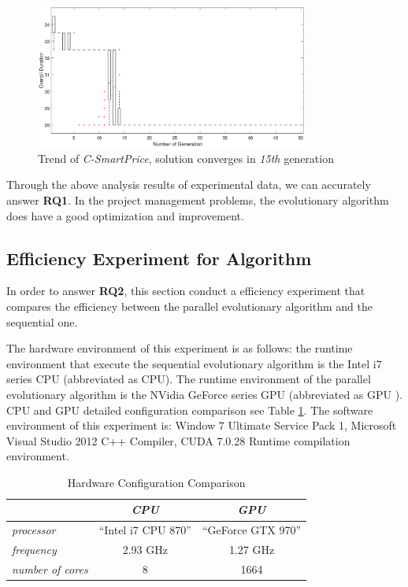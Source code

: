 \begin{figure}[!htb]
  \centering
  \includegraphics[width=0.8\textwidth]{figures/fig_pa3.eps}
  \caption{Trend of \emph{C-SmartPrice}, solution converges in \emph{15th} generation}
  \label{fig:pa3}
\end{figure}

Through the above analysis results of experimental data, we can accurately
answer \textbf{RQ1}. In the project management problems, the evolutionary
algorithm does have a good optimization and improvement.


\subsection{Efficiency Experiment for Algorithm}
%
In order to answer \textbf{RQ2}, this section conduct a efficiency experiment
that compares the efficiency between the parallel evolutionary algorithm and the
sequential one.

The hardware environment of this experiment is as follows: the runtime
environment that execute the sequential evolutionary algorithm is the Intel i7
series CPU (abbreviated as CPU). The runtime environment of the parallel
evolutionary algorithm is the NVidia GeForce series GPU (abbreviated as GPU
). CPU and GPU detailed configuration comparison see Table \ref{tab:cpugpu}. The
software environment of this experiment is: Window 7 Ultimate Service Pack 1,
Microsoft Visual Studio 2012 C++ Compiler, CUDA 7.0.28 Runtime compilation
environment.

\begin{table}[!h]
  \centering
  \caption{Hardware Configuration Comparison}
  \label{tab:cpugpu}
  \begin{tabular}{lcc}
    \hline
        & \emph{ CPU } & \emph{ GPU } \\
    \hline
    \emph{ processor } & ``Intel i7 CPU 870'' & ``GeForce GTX 970'' \\
    \emph{ frequency } & 2.93 GHz & 1.27 GHz \\
    \emph{ number of cores } & 8 & 1664 \\
    \hline
  \end{tabular}
\end{table}

